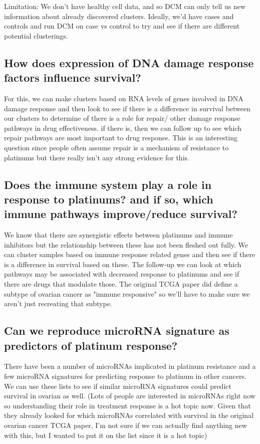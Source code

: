 \documentclass{article}
\begin{document}
Limitation: We don't have healthy cell data, and so DCM can only tell us new information about already discovered clusters. Ideally, we'd have cases and controls and run DCM on case vs control to try and see if there are different potential clusterings. 



\subsection{How does expression of DNA damage response factors influence survival?}
For this, we can make clusters based on RNA levels of genes involved in DNA damage response and then look to see if there is a difference in survival between our clusters to determine of there is a role for repair/ other damage response pathways in drug effectiveness. if there is, then we can follow up to see which repair pathways are most important to drug response. This is an interesting question since people often assume repair is a mechanism of resistance to platinums but there really isn't any strong evidence for this.

\subsection{Does the immune system play a role in response to platinums? and if so, which immune pathways improve/reduce survival?}

We know that there are synergistic effects between platinums and immune inhibitors but the relationship between these has not been fleshed out fully.  We can cluster samples based on immune response related genes and then see if there is a difference in survival based on these. The follow-up we can look at which pathways may be associated with decreased response to platinums and see if there are drugs that modulate those. The original TCGA paper did define a subtype of ovarian cancer as "immune responsive" so we'll have to make sure we aren't just recreating that subtype. 

\subsection{Can we reproduce microRNA signature as predictors of platinum response?}
There have been a number of microRNAs implicated in platinum resistance and a few microRNA signatures for predicting response to platinum in other cancers. We can use these lists to see if similar microRNA signatures could predict survival in ovarian as well. (Lots of people are interested in microRNAs right now so understanding their role in treatment response is a hot topic now.  Given that they already looked for which microRNAs correlated with survival in the original ovarian cancer TCGA paper, I'm not sure if we can actually find anything new with this, but I wanted to put it on the list since it is a hot topic)  



{}

\end{document}

